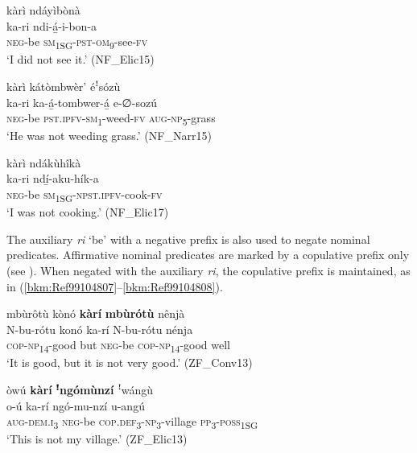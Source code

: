 \newpage
\ea
\label{bkm:Ref99104743}
kàrì ndáyìbònà\\
\gll ka-ri    ndi-á̲-i-bon-a\\
\textsc{neg}-be  \textsc{sm}\textsubscript{1SG}-\textsc{pst}-\textsc{om}\textsubscript{9}-see-\textsc{fv}\\
\glt ‘I did not see it.’ (NF\_Elic15)
\z

\ea
\label{bkm:Ref99104763}
kàrì kátòmbwèr’ éꜝsózù\\
\gll ka-ri    ka-á̲-tombwer-á̲    e-∅-sozú\\
\textsc{neg}-be  \textsc{pst}.\textsc{ipfv}-\textsc{sm}\textsubscript{1}-weed-\textsc{fv}  \textsc{aug}-\textsc{np}\textsubscript{5}-grass\\
\glt ‘He was not weeding grass.’ (NF\_Narr15)
\z

\ea
\label{bkm:Ref489284413}
kàrì ndákùhîkà\\
\gll ka-ri    ndí̲-aku-hík-a\\
\textsc{neg}-be  \textsc{sm}\textsubscript{1SG}-\textsc{npst}.\textsc{ipfv}-cook-\textsc{fv}\\
\glt ‘I was not cooking.’ (NF\_Elic17)
\z

The auxiliary \textit{ri} ‘be’ with a negative prefix is also used to negate nominal predicates. Affirmative nominal predicates are marked by a copulative prefix only (see ). When negated with the auxiliary \textit{ri}, the copulative prefix is maintained, as in (\ref{bkm:Ref99104807}--\ref{bkm:Ref99104808}).

\ea
\label{bkm:Ref99104807}
mbùrôtù kònó \textbf{kàrí} \textbf{mbùrótù} nênjà\\
\gll N-bu-rótu    konó  ka-rí    N-bu-rótu    nénja\\
\textsc{cop}-\textsc{np}\textsubscript{14}-good  but  \textsc{neg}-be  \textsc{cop}-\textsc{np}\textsubscript{14}-good  well\\
\glt ‘It is good, but it is not very good.’ (ZF\_Conv13)
\z

\ea
\label{bkm:Ref99104808}
òwú \textbf{kàrí} \textbf{ꜝ}\textbf{ngómùnzí} ꜝwángù\\
\gll o-ú    ka-rí    ngó-mu-nzí      u-angú\\
\textsc{aug}-\textsc{dem}.\textsc{i}\textsubscript{3}  \textsc{neg}-be  \textsc{cop}.\textsc{def}\textsubscript{3}-\textsc{np}\textsubscript{3}-village  \textsc{pp}\textsubscript{3}-\textsc{poss}\textsubscript{1SG}\\
\glt ‘This is not my village.’ (ZF\_Elic13)
\z

